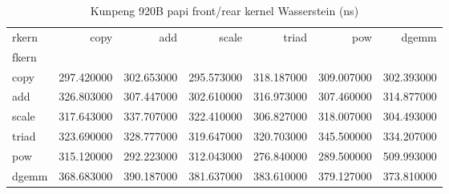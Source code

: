 \begin{table}
\caption{Kunpeng 920B papi front/rear kernel Wasserstein (ns)}
\begin{tabular}{lrrrrrr}
\toprule
rkern & copy & add & scale & triad & pow & dgemm \\
fkern &  &  &  &  &  &  \\
\midrule
copy & 297.420000 & 302.653000 & 295.573000 & 318.187000 & 309.007000 & 302.393000 \\
add & 326.803000 & 307.447000 & 302.610000 & 316.973000 & 307.460000 & 314.877000 \\
scale & 317.643000 & 337.707000 & 322.410000 & 306.827000 & 318.007000 & 304.493000 \\
triad & 323.690000 & 328.777000 & 319.647000 & 320.703000 & 345.500000 & 334.207000 \\
pow & 315.120000 & 292.223000 & 312.043000 & 276.840000 & 289.500000 & 509.993000 \\
dgemm & 368.683000 & 390.187000 & 381.637000 & 383.610000 & 379.127000 & 373.810000 \\
\bottomrule
\end{tabular}
\end{table}
